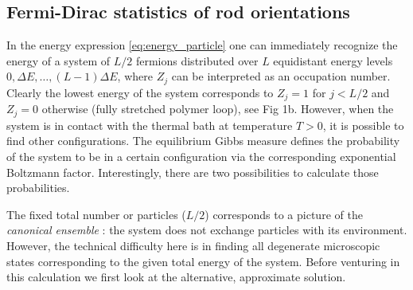 \documentclass[aps,showpacs,twocolumn,floatfix,prx,superscriptaddress]{revtex4-1}
\begin{document}
\subsection{Fermi-Dirac statistics of rod orientations}
In the energy expression \eqref{eq:energy_particle} one can immediately recognize the energy of a system of $L/2$ fermions distributed over $L$ equidistant energy levels $0, \Delta E, \ldots, (L-1) \Delta E$, where $Z_j$ can be interpreted as an occupation number. Clearly the lowest energy of the system corresponds to $Z_j = 1$ for $j < L/2$ and $Z_j=0$ otherwise (fully stretched polymer loop), see Fig 1b. However, when the system is in contact with the thermal bath at temperature $T>0$, it is possible to find other configurations. The equilibrium Gibbs measure defines the probability of the system to be in a certain configuration via the corresponding exponential Boltzmann factor.
Interestingly, there are two possibilities to calculate those probabilities. 


The fixed total number or particles ($L/2$) corresponds to a picture of the \emph{canonical ensemble} \cite{Chandler1987,Huang1987}: the system does not exchange particles with its environment. However, the technical difficulty here is in finding all degenerate microscopic states corresponding to the given total energy of the system. Before venturing in this calculation we first look at the alternative, approximate solution.

\end{document}
